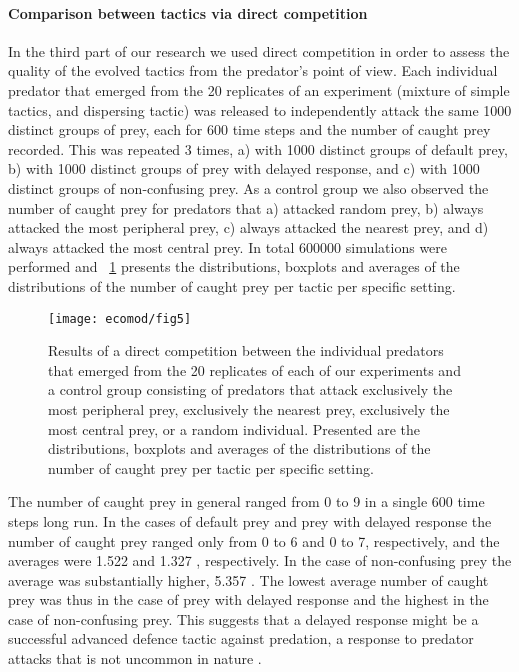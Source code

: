 \paragraph{Comparison between tactics via direct competition} In the third part of our research we used direct competition in order to assess the quality of the evolved tactics from the predator's point of view. Each individual predator that emerged from the 20 replicates of an experiment (mixture of simple tactics, and dispersing tactic) was released to independently attack the same \num{1000} distinct groups of prey, each for 600 time steps and the number of caught prey recorded. This was repeated 3 times, a) with 1000 distinct groups of default prey, b) with 1000 distinct groups of prey with delayed response, and c) with 1000 distinct groups of non-confusing prey. As a control group we also observed the number of caught prey for predators that a) attacked random prey, b) always attacked the most peripheral prey, c) always attacked the nearest prey, and d) always attacked the most central prey. In total \num{600000} simulations were performed and \figurename~\ref{fig:mvsd} presents the distributions, boxplots and averages of the distributions of the number of caught prey per tactic per specific setting.

\begin{figure}
	\texttt{[image: ecomod/fig5]}
	\caption{Results of a direct competition between the individual predators that emerged from the 20 replicates of each of our experiments and a control group consisting of predators that attack exclusively the most peripheral prey, exclusively the nearest prey, exclusively the most central prey, or a random individual. Presented are the distributions, boxplots and averages of the distributions of the number of caught prey per tactic per specific setting.}
	\label{fig:mvsd}
\end{figure}

The number of caught prey in general ranged from 0 to 9 in a single 600 time steps long run. In the cases of default prey and prey with delayed response the number of caught prey ranged only from 0 to 6 and 0 to 7, respectively, and the averages were \num{1.522}  and \num{1.327} , respectively. In the case of non-confusing prey the average was substantially higher, \ie \num{5.357} . The lowest average number of caught prey was thus in the case of prey with delayed response and the highest in the case of non-confusing prey. This suggests that a delayed response might be a successful advanced defence tactic against predation, a response to predator attacks that is not uncommon in nature \cite{partridge1982structure}.

